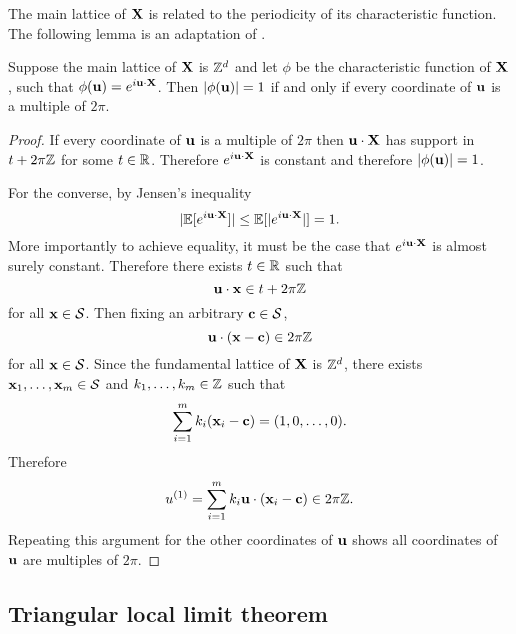 The main lattice of ${\mathbf X}$ is related to the periodicity of its characteristic function. The following lemma is an adaptation of \cite[P.67, T1]{spitzerPrinciplesRandomWalk1964}.
\begin{lemma}
    \label{lem:cf-periodicity}
    Suppose the main lattice of ${\mathbf X}$ is ${\mathbb Z}^d$ and let $\phi$ be the characteristic function of ${\mathbf X}$, such that $\phi({\mathbf u}) = e^{i {\mathbf u} \cdot {\mathbf X}}$. Then $\lvert\phi({\mathbf u})\rvert = 1$ if and only if every coordinate of ${\mathbf u}$ is a multiple of $2 \pi$.
\end{lemma}
\begin{proof}
    If every coordinate of ${\mathbf u}$ is a multiple of $2\pi$ then ${\mathbf u} \cdot {\mathbf X}$ has support in $t + 2 \pi {\mathbb Z}$ for some $t \in {\mathbb R}$. Therefore $e^{i{\mathbf u} \cdot {\mathbf X}}$ is constant and therefore $\lvert\phi({\mathbf u})\rvert = 1$.
    
    For the converse, by Jensen's inequality
    \begin{equation*}
        \lvert{\mathbb E}[e^{i {\mathbf u} \cdot {\mathbf X}}]\rvert \leq {\mathbb E}[\lvert e^{i{\mathbf u} \cdot {\mathbf X}}\rvert] = 1.
    \end{equation*}
    More importantly to achieve equality, it must be the case that $e^{i {\mathbf u} \cdot {\mathbf X}}$ is almost surely constant. Therefore there exists $t \in {\mathbb R}$ such that
    \begin{equation*}
        {\mathbf u} \cdot {\mathbf x} \in t + 2 \pi {\mathbb Z}
    \end{equation*}
    for all ${\mathbf x} \in {\mathcal S}$. Then fixing an arbitrary ${\mathbf c} \in {\mathcal S}$,
    \begin{equation*}
        {\mathbf u} \cdot ({\mathbf x} - {\mathbf c}) \in 2 \pi {\mathbb Z}
    \end{equation*}
    for all ${\mathbf x} \in {\mathcal S}$. Since the fundamental lattice of ${\mathbf X}$ is ${\mathbb Z}^d$, there exists ${\mathbf x}_1, \ldots, {\mathbf x}_m \in {\mathcal S}$ and $k_1, \ldots, k_m \in {\mathbb Z}$ such that
    \begin{equation*}
        \sum_{i=1}^m k_i ({\mathbf x}_i - {\mathbf c}) = (1, 0, \ldots, 0).
    \end{equation*}
    Therefore
    \begin{equation*}
        u^{(1)} = \sum_{i=1}^m k_i {\mathbf u} \cdot ({\mathbf x}_i - {\mathbf c}) \in 2 \pi {\mathbb Z}.
    \end{equation*}
    Repeating this argument for the other coordinates of ${\mathbf u}$ shows all coordinates of ${\mathbf u}$ are multiples of $2 \pi$.
\end{proof}


\subsection{Triangular local limit theorem}

